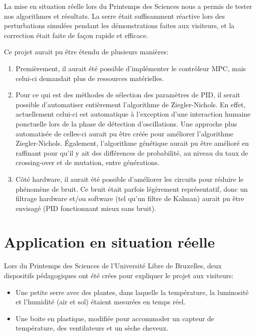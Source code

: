 \documentclass[a4paper,10pt]{report}
\begin{document}
La mise en situation réelle lors du Printemps des Sciences nous a permis de tester nos algorithmes et résultats. La serre était suffisamment réactive lors des perturbations simulées pendant les démonstrations faites aux visiteurs, et la correction était faite de façon rapide et efficace.

Ce projet aurait pu être étendu de plusieurs manières:

\begin{enumerate}
\item Premièrement, il aurait été possible d'implémenter le contrôleur MPC, mais celui-ci demandait plus de ressources matérielles.
\item Pour ce qui est des méthodes de sélection des paramètres de PID, il serait possible d'automatiser entièrement l'algorithme de Ziegler-Nichols. En effet, actuellement celui-ci est automatique à l'exception d'une interaction humaine ponctuelle lors de la phase de détection d'oscillations. Une approche plus automatisée de celles-ci aurait pu être créée pour améliorer l'algorithme Ziegler-Nichols. Également, l'algorithme génétique aurait pu être amélioré en raffinant pour qu'il y ait des différences de probabilité, au niveau du taux de crossing-over et de mutation, entre générations.
\item Côté hardware, il aurait été possible d'améliorer les circuits pour réduire le phénomène de bruit. Ce bruit était parfois légèrement représentatif, donc un filtrage hardware et/ou software (tel qu'un filtre de Kalman) aurait pu être envisagé (PID fonctionnant mieux sans bruit).
\end{enumerate}






\appendix
\chapter{Application en situation réelle}


Lors du Printemps des Sciences de l'Université Libre de Bruxelles, deux dispositifs pédagogiques ont été crées pour expliquer le projet aux visiteurs:

\begin{itemize}
\item Une petite serre avec des plantes, dans laquelle la température, la luminosité et l'humidité (air et sol) étaient mesurées en temps réel.
\item Une boite en plastique, modifiée pour accommoder un capteur de température, des ventilateurs et un sèche cheveux.
\end{itemize}
\end{document}
